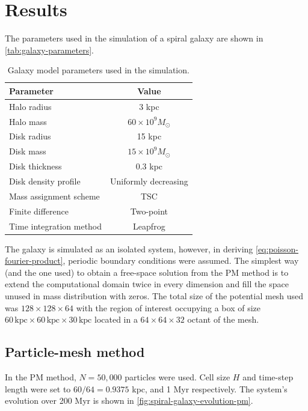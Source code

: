 \section{Results}
The parameters used in the simulation of a spiral galaxy are shown in \autoref{tab:galaxy-parameters}.
\begin{table}[htp]
    \centering
    \begin{tabular}{|l|c|}
        \hline
        \textbf{Parameter}      & \textbf{Value}           \\
        \hline
        Halo radius             & 3 kpc                    \\
        Halo mass               & $60 \times 10^9 M_\odot$ \\
        Disk radius             & 15 kpc                   \\
        Disk mass               & $15 \times 10^9 M_\odot$ \\
        Disk thickness          & 0.3 kpc                  \\
        Disk density profile    & Uniformly decreasing     \\
        Mass assignment scheme  & TSC                      \\
        Finite difference       & Two-point                \\
        Time integration method & Leapfrog                 \\
        \hline
    \end{tabular}
    \caption{Galaxy model parameters used in the simulation.}
    \label{tab:galaxy-parameters}
\end{table}
The galaxy is simulated as an isolated system, however, in deriving \autoref{eq:poisson-fourier-product}, periodic boundary conditions were assumed.
The simplest way (and the one used) to obtain a free-space solution from the PM method is to extend the computational domain twice in every dimension and fill the space unused in mass distribution with zeros.
The total size of the potential mesh used was $128 \times 128 \times 64$ with the region of interest occupying a box of size $60\, \text{kpc}\times 60\, \text{kpc}\times 30\, \text{kpc}$ located in a $64 \times 64 \times 32$ octant of the mesh.

\subsection{Particle-mesh method}
In the PM method, $N=50,000$ particles were used.
Cell size $H$ and time-step length were set to $60/64=0.9375$ kpc, and 1 Myr respectively.
The system's evolution over 200 Myr is shown in \autoref{fig:spiral-galaxy-evolution-pm}.

